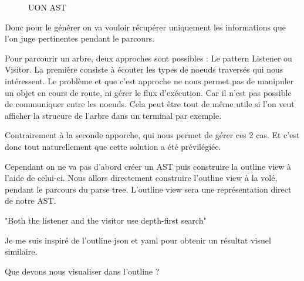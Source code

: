 \documentclass[
    iict, %
    il, %
]{heig-tb}
\begin{document}
\begin{figure}[!h]
    \begin{center}
    \end{center}
    \caption[UON AST]{\label{ast} UON AST}
\end{figure}


Donc pour le générer on va vouloir récupérer uniquement les informations que l'on juge pertinentes pendant le parcours.

Pour parcourir un arbre, deux approches sont possibles : Le pattern Listener ou Visitor.
La première consiste à écouter les types de noeuds traversés qui nous intéressent. Le problème et que c'est approche ne nous permet pas de manipuler un objet en cours de route, ni gérer le flux d'exécution.
Car il n'est pas possible de communiquer entre les noeuds. Cela peut être tout de même utile si l'on veut afficher la strucure de l'arbre dans un terminal par exemple.

Contrairement à la seconde apporche, qui nous permet de gérer ces 2 cas. Et c'est donc tout naturellement que cette solution a été prévilégiée.

Cependant on ne va pas d'abord créer un AST puis construire la outline view à l'aide de celui-ci.
Nous allors directement construire l'outline view à la volé, pendant le parcours du parse tree. L'outline view sera une représentation direct de notre AST.


"Both the listener and the visitor use depth-first search"

Je me suis inspiré de l'outline json et yaml pour obtenir un résultat visuel similaire.

Que devons nous visualiser dans l'outline ?
\end{document}
